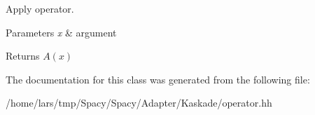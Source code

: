 Apply operator. 


\begin{DoxyParams}{Parameters}
{\em x} & argument \\
\hline
\end{DoxyParams}
\begin{DoxyReturn}{Returns}
$A(x)$ 
\end{DoxyReturn}


The documentation for this class was generated from the following file\+:\begin{DoxyCompactItemize}
\item 
/home/lars/tmp/\+Spacy/\+Spacy/\+Adapter/\+Kaskade/operator.\+hh\end{DoxyCompactItemize}
